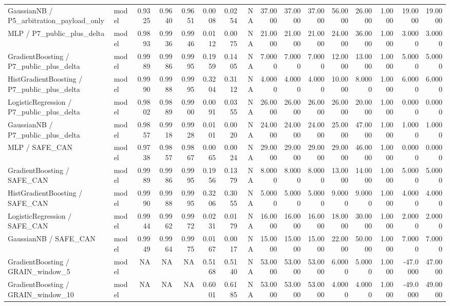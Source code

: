 \begin{tabular}{llrrrrrrrrrrrrrr}
GaussianNB / P5\_arbitration\_payload\_only & model & 0.9325 & 0.9640 & 0.9651 & 0.0008 & 0.0254 & NA & 37.0000 & 37.0000 & 37.0000 & 56.0000 & 26.0000 & 1.0000 & 19.0000 & 19.0000 \\
MLP / P7\_public\_plus\_delta & model & 0.9893 & 0.9936 & 0.9946 & 0.0112 & 0.0075 & NA & 21.0000 & 21.0000 & 21.0000 & 24.0000 & 36.0000 & 1.0000 & 3.0000 & 3.0000 \\
GradientBoosting / P7\_public\_plus\_delta & model & 0.9989 & 0.9986 & 0.9995 & 0.1959 & 0.1405 & NA & 7.0000 & 7.0000 & 7.0000 & 12.0000 & 13.0000 & 1.0000 & 5.0000 & 5.0000 \\
HistGradientBoosting / P7\_public\_plus\_delta & model & 0.9990 & 0.9988 & 0.9995 & 0.3204 & 0.3112 & NA & 4.0000 & 4.0000 & 4.0000 & 10.0000 & 8.0000 & 1.0000 & 6.0000 & 6.0000 \\
LogisticRegression / P7\_public\_plus\_delta & model & 0.9802 & 0.9889 & 0.9900 & 0.0091 & 0.0355 & NA & 26.0000 & 26.0000 & 26.0000 & 26.0000 & 20.0000 & 1.0000 & 0.0000 & 0.0000 \\
GaussianNB / P7\_public\_plus\_delta & model & 0.9857 & 0.9918 & 0.9928 & 0.0101 & 0.0020 & NA & 24.0000 & 24.0000 & 24.0000 & 25.0000 & 47.0000 & 1.0000 & 1.0000 & 1.0000 \\
MLP / SAFE\_CAN & model & 0.9738 & 0.9857 & 0.9867 & 0.0065 & 0.0024 & NA & 29.0000 & 29.0000 & 29.0000 & 29.0000 & 46.0000 & 1.0000 & 0.0000 & 0.0000 \\
GradientBoosting / SAFE\_CAN & model & 0.9989 & 0.9986 & 0.9995 & 0.1956 & 0.1379 & NA & 8.0000 & 8.0000 & 8.0000 & 13.0000 & 14.0000 & 1.0000 & 5.0000 & 5.0000 \\
HistGradientBoosting / SAFE\_CAN & model & 0.9990 & 0.9988 & 0.9995 & 0.3206 & 0.3055 & NA & 5.0000 & 5.0000 & 5.0000 & 9.0000 & 9.0000 & 1.0000 & 4.0000 & 4.0000 \\
LogisticRegression / SAFE\_CAN & model & 0.9944 & 0.9962 & 0.9972 & 0.0231 & 0.0179 & NA & 16.0000 & 16.0000 & 16.0000 & 18.0000 & 30.0000 & 1.0000 & 2.0000 & 2.0000 \\
GaussianNB / SAFE\_CAN & model & 0.9949 & 0.9964 & 0.9975 & 0.0167 & 0.0017 & NA & 15.0000 & 15.0000 & 15.0000 & 22.0000 & 50.0000 & 1.0000 & 7.0000 & 7.0000 \\
GradientBoosting / GRAIN\_window\_5 & model & NA & NA & NA & 0.5168 & 0.5140 & NA & 53.0000 & 53.0000 & 53.0000 & 6.0000 & 5.0000 & 1.0000 & -47.0000 & 47.0000 \\
GradientBoosting / GRAIN\_window\_10 & model & NA & NA & NA & 0.6001 & 0.6185 & NA & 53.0000 & 53.0000 & 53.0000 & 4.0000 & 4.0000 & 1.0000 & -49.0000 & 49.0000 \\

\end{tabular}
